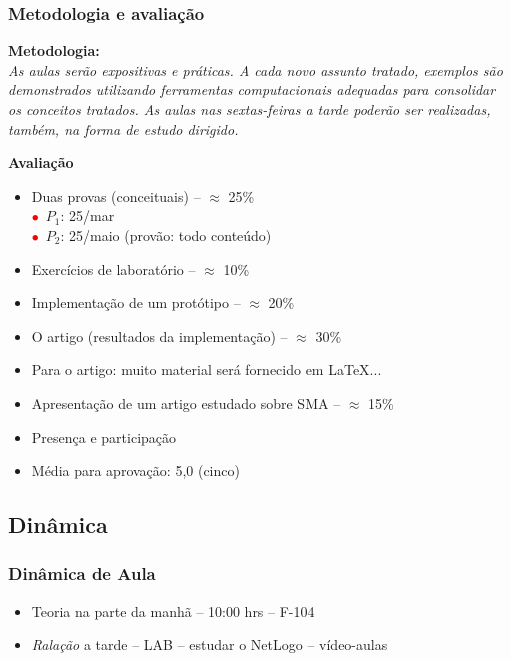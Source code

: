 \begin{frame}[allowframebreaks=0.9]

\frametitle{Metodologia e avaliação}

\textbf{Metodologia:} \\

\textit{As aulas serão expositivas e práticas. A cada novo assunto tratado, exemplos 
 são demonstrados utilizando ferramentas computacionais adequadas para consolidar os conceitos 
 tratados. 
  As aulas nas sextas-feiras a tarde poderão ser realizadas, também, na forma de estudo dirigido.}


\newpage
    \textbf{Avaliação}

    \begin{itemize}
      \item Duas provas (conceituais) -- $\approx$  25\%\\
      
	\quad \textcolor{red}{$\bullet$}~$P_1$: 25/mar\\
	\quad \textcolor{red}{$\bullet$}~$P_2$: 25/maio (provão: todo conteúdo)


      \item Exercícios de laboratório  -- $\approx$ 10\%
      \item Implementação de um protótipo  -- $\approx$ 20\%
       \item O artigo (resultados da implementação)  -- $\approx$ 30\%

      \item Para o artigo: muito material será fornecido em \LaTeX ...

      \item Apresentação de um artigo estudado sobre SMA -- $\approx$ 15\%
 
      \item Presença e participação
      
      \item Média para aprovação: 5,0 (cinco)
      
    \end{itemize}

\end{frame}



\subsection{Dinâmica}
\begin{frame}

    \frametitle{Dinâmica de Aula}

    \begin{itemize}
      
      \item Teoria na parte da manhã -- 10:00 hrs -- F-104
      \item \textit{Ralação} a tarde -- LAB -- estudar o NetLogo -- vídeo-aulas
      
    \end{itemize}
\end{frame}




